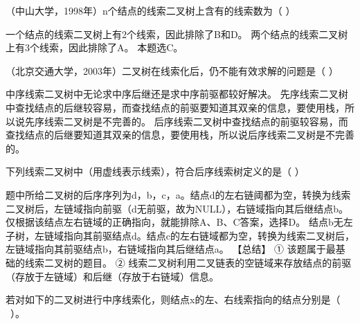 \question （中山大学，1998年）n个结点的线索二叉树上含有的线索数为（ ）
\par{}
\begin{solution}一个结点的线索二叉树上有2个线索，因此排除了B和D。
两个结点的线索二叉树上有3个线索，因此排除了A。 本题选C。
\end{solution}
\question （北京交通大学，2003年）二叉树在线索化后，仍不能有效求解的问题是（ ）
\par{}
\begin{solution}中序线索二叉树中无论求中序后继还是求中序前驱都较好解决。
先序线索二叉树中查找结点的后继较容易，而查找结点的前驱要知道其双亲的信息，要使用栈，所以说先序线索二叉树是不完善的。
后序线索二叉树中查找结点的前驱较容易，而查找结点的后继要知道其双亲的信息，要使用栈，所以说后序线索二叉树是不完善的。
\end{solution}
\question 下列线索二叉树中（用虚线表示线索），符合后序线索树定义的是（ ）
\par\fourch{}{}{}{\textcolor{red}{}}
\begin{solution}题中所给二叉树的后序序列为d，b，c，a。结点d的左右链阈都为空，转换为线索二叉树后，左链域指向前驱（d无前驱，故为NULL），右链域指向其后继结点b。仅根据该结点左右链域的正确指向，就能排除A、B、C答案，选择D。
结点b无左子树，左链域指向其前驱结点d。结点c的左右链域都为空，转换为线索二叉树后，左链域指向其前驱结点b，右链域指向其后继结点a。
【总结】 ① 该题属于最基础的线索二叉树的题目。 ②
线索二叉树利用二叉链表的空链域来存放结点的前驱（存放于左链域）和后继（存放于右链域）信息。
\end{solution}
\question 若对如下的二叉树进行中序线索化，则结点x的左、右线索指向的结点分别是（
~）。

